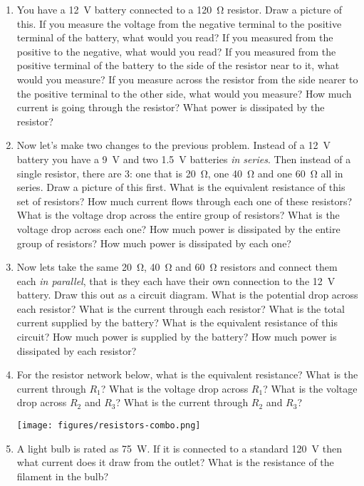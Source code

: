 \begin{enumerate}
	\item
	You have a \SI{12}{\volt} battery connected to a \SI{120}{\ohm} resistor. Draw a picture of this. If you measure the voltage from the negative terminal to the positive terminal of the battery, what would you read? If you measured from the positive to the negative, what would you read? If you measured from the positive terminal of the battery to the side of the resistor near to it, what would you measure? If you measure across the resistor from the side nearer to the positive terminal to the other side, what would you measure? How much current is going through the resistor? What power is dissipated by the resistor? \newpage
	
	\item 
	Now let's make two changes to the previous problem. Instead of a \SI{12}{\volt} battery you have a \SI{9}{V} and two \SI{1.5}{\volt} batteries \emph{in series}. Then instead of a single resistor, there are 3: one that is \SI{20}{\ohm}, one \SI{40}{\ohm} and one \SI{60}{\ohm} all in series. Draw a picture of this first. What is the equivalent resistance of this set of resistors? How much current flows through each one of these resistors?  What is the voltage drop across the entire group of resistors? What is the voltage drop across each one? How much power is dissipated by the entire group of resistors? How much power is dissipated by each one? \newpage
	
	\item
    Now lets take the same \SI{20}{\ohm}, \SI{40}{\ohm} and \SI{60}{\ohm} resistors and connect them each \emph{in parallel}, that is they each have their own connection to the \SI{12}{\volt} battery. Draw this out as a circuit diagram. What is the potential drop across each resistor? What is the current through each resistor? What is the total current supplied by the battery? What is the equivalent resistance of this circuit? How much power is supplied by the battery? How much power is dissipated by each resistor?
    \newpage 
	
	\item
	For the resistor network below, what is the equivalent resistance? What is the current through $R_1$? What is the voltage drop across $R_1$? What is the voltage drop across $R_2$ and $R_3$? What is the current through $R_2$ and $R_3$? 
	
	\texttt{[image: figures/resistors-combo.png]}
		
	\item
	A light bulb is rated as \SI{75}{\watt}. If it is connected to a standard \SI{120}{\volt} then what current does it draw from the outlet? What is the resistance of the filament in the bulb?
	

\end{enumerate}
